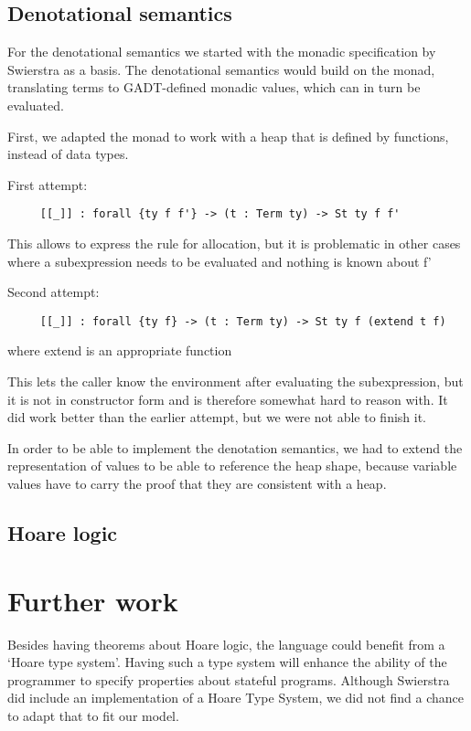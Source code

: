 \documentclass{article}
\begin{document}
\subsection{Denotational semantics} %

For the denotational semantics we started with the monadic
specification by Swierstra as a basis. The denotational semantics
would build on the monad, translating terms to GADT-defined monadic
values, which can in turn be evaluated.

First, we adapted the monad to work with a heap that is defined by
functions, instead of data types.

First attempt:

\begin{lstlisting}
     [[_]] : forall {ty f f'} -> (t : Term ty) -> St ty f f'
\end{lstlisting}

This allows to express the rule for allocation, but it is problematic
in other cases where a subexpression needs to be evaluated and
nothing is known about f'

Second attempt:

\begin{lstlisting}
     [[_]] : forall {ty f} -> (t : Term ty) -> St ty f (extend t f)
\end{lstlisting}
where extend is an appropriate function

This lets the caller know the environment after evaluating the
subexpression, but it is not in constructor form and is therefore
somewhat hard to reason with. It did work better than the earlier
attempt, but we were not able to finish it.

In order to be able to implement the denotation semantics, we had to
extend the representation of values to be able to reference the heap
shape, because variable values have to carry the proof that they are
consistent with a heap.

\subsection{Hoare logic}


\section{Further work}\label{sec:further}

Besides having theorems about Hoare logic, the language could benefit from a `Hoare type system'. Having such a type system will enhance the ability of the programmer to specify properties about stateful programs. Although Swierstra did include an implementation of a Hoare Type System, we did not find a chance to adapt that to fit our model.
\end{document}

